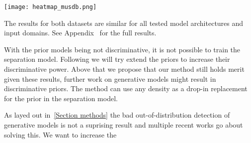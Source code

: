 \begin{marginfigure}
    \texttt{[image: heatmap\_musdb.png]}%
    \label{fig:heatmap_musdb}
\end{marginfigure}

The results for both datasets are similar for all tested model architectures and input domains. See Appendix~ for the full results.

With the prior models being not discriminative, it is not possible to train the separation model. Following we will try extend the priors to increase their discriminative power. Above that we propose that our method still holds merit given these results, further work on generative models might result in discriminative priors. The method can use any density as a drop-in replacement for the prior in the separation model.

As layed out in~\ref{Section methods} the bad out-of-distribution detection of generative models is not a suprising result and multiple recent works go about solving this. We want to increase the
